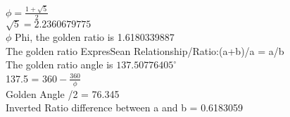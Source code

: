 \documentclass{article} %
\begin{document}
%
$\phi = \frac{1 + \sqrt{5}}{2}$
\\ %
$\sqrt{5}=2.2360679775$
\\
\newcommand{\goldenratio}{1.6180339887}
$\phi$ Phi, the golden ratio is \goldenratio
\\
The golden ratio ExpresSean Relationship/Ratio:(a+b)/a = a/b
\\
The golden ratio angle is \ensuremath{137.50776405^\circ}
\\
    137.5 = $360 - \frac{360}{\phi}$
\\
Golden Angle /2 = 76.345
\\
Inverted Ratio difference between a and b = 0.6183059
\\
\end{document}
